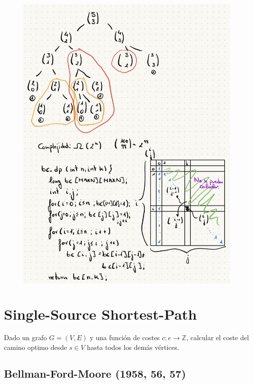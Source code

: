\documentclass[12pt, twoside, openright]{report} %
\begin{document}
\begin{figure}[H]
	{\includegraphics[scale=.32]{Untitled 24.png}}
\end{figure}
\pagebreak
\section{Single-Source Shortest-Path}

  
Dado un grafo \(G=(V,E)\) y una función de costes \(c: e → \mathbb{Z}\),
calcular el coste del camino optimo desde \(s \in V\) hasta todos los
demás vértices.

\subsection{Bellman-Ford-Moore (1958, 56, 57)}
\end{document}
